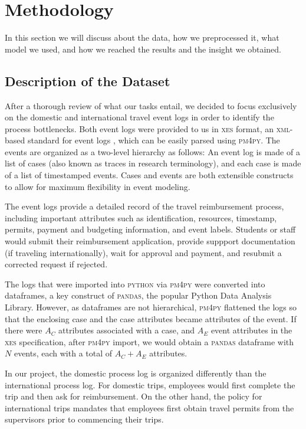 \documentclass[conference]{IEEEtran}
\begin{document}
\section{Methodology}
\label{section-methodology}

In this section we will discuss about the data, 
how we preprocessed it, what model we used, and how
we reached the results and the insight we obtained.

\subsection{Description of the Dataset}

After a thorough review of what our tasks entail, we decided to focus
exclusively on the domestic and international travel event logs in order
to identify the process bottlenecks.  Both event logs
were provided to us in \textsc{xes} format,
an \textsc{xml}-based standard for event logs \cite{XES2021}, which can
be easily parsed using \textsc{pm4py}.
The events are organized as a two-level hierarchy as follows:
An event log is made of a list of cases
(also known as traces in research
terminology), and each case is made of a list of timestamped events. Cases and
events are both extensible constructs to allow for maximum flexibility in
event modeling.

The event logs provide a detailed record of the travel reimbursement process,
including important attributes such as identification, resources,
timestamp, permits, payment and budgeting information, and event labels.
Students or staff would submit their reimbursement application,
provide suppport documentation (if traveling internationally), wait for
approval and payment, and resubmit a corrected request if rejected.

The logs that were imported into \textsc{python} via 
\textsc{pm4py} were converted into
dataframes, a key construct of
\textsc{pandas}, the popular Python Data Analysis Library. However, as
dataframes are not hierarchical, \textsc{pm4py} flattened the logs so that 
the enclosing case and the case attributes
became attributes of the event. If
there were $A_C$ attributes associated with a
case, and $A_E$ event attributes in the
\textsc{xes} specification, after \textsc{pm4py} import, we would obtain a
\textsc{pandas} dataframe 
with $N$ events, each with a total of $A_C + A_E$ attributes.

In our project,
the domestic process log is organized differently than
the international process log.  For domestic trips, employees would first
complete the trip and then ask for reimbursement. On the other hand,
the policy for international trips mandates that
employees first obtain travel permits from the supervisors prior to
commencing their trips.
\end{document}
